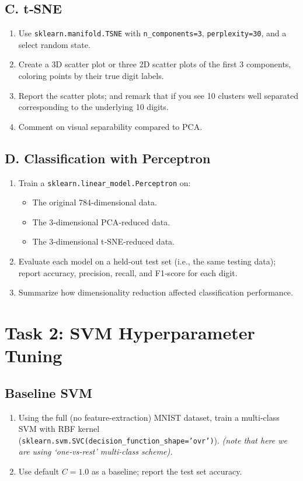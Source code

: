 \documentclass[12pt]{article}
\begin{document}
\subsection*{C. t‑SNE}
\begin{enumerate}
  \item Use \texttt{sklearn.manifold.TSNE} with \texttt{n\_components=3}, \texttt{perplexity=30}, and a select random state.
  \item Create a 3D scatter plot or three 2D scatter plots of the first 3 components, coloring points by their true digit labels. 
  \item Report the scatter plots; and remark that if you see 10 clusters well separated corresponding to the underlying 10 digits. 
  \item Comment on visual separability compared to PCA.
\end{enumerate}

\subsection*{D. Classification with Perceptron}
\begin{enumerate}
  \item Train a \texttt{sklearn.linear\_model.Perceptron} on:
    \begin{itemize}
      \item The original 784‐dimensional data.
      \item The 3‐dimensional PCA‐reduced data.
      \item The 3‐dimensional t‑SNE‐reduced data.
    \end{itemize}
  \item Evaluate each model on a held‐out test set (i.e., the same testing data); report accuracy, precision, recall, and F1‐score for each digit. 
  \item Summarize how dimensionality reduction affected classification performance.
\end{enumerate}

\newpage

\section*{Task 2: SVM Hyperparameter Tuning}
\subsection*{Baseline SVM}
\begin{enumerate}
  \item Using the full (no feature‐extraction) MNIST dataset, train a multi‐class SVM with RBF kernel (\texttt{sklearn.svm.SVC(decision\_function\_shape='ovr')}). \textit{(note that here we are using `one-vs-rest' multi-class scheme).}
  \item Use default \(C=1.0\) as a baseline; report the test set accuracy.
\end{enumerate}
\end{document}
